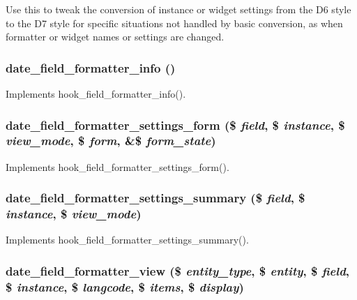 Use this to tweak the conversion of instance or widget settings from the D6 style to the D7 style for specific situations not handled by basic conversion, as when formatter or widget names or settings are changed. \hypertarget{date_8field_8inc_a41de0b573e603d7d442c261660b76855}{
\subsubsection[{date\_\-field\_\-formatter\_\-info}]{\setlength{\rightskip}{0pt plus 5cm}date\_\-field\_\-formatter\_\-info ()}}
\label{date_8field_8inc_a41de0b573e603d7d442c261660b76855}
Implements hook\_\-field\_\-formatter\_\-info(). \hypertarget{date_8field_8inc_a224654ed8b7e1a260375ed74e5fc0d74}{
\subsubsection[{date\_\-field\_\-formatter\_\-settings\_\-form}]{\setlength{\rightskip}{0pt plus 5cm}date\_\-field\_\-formatter\_\-settings\_\-form (\$ {\em field}, \/  \$ {\em instance}, \/  \$ {\em view\_\-mode}, \/  \$ {\em form}, \/  \&\$ {\em form\_\-state})}}
\label{date_8field_8inc_a224654ed8b7e1a260375ed74e5fc0d74}
Implements hook\_\-field\_\-formatter\_\-settings\_\-form(). \hypertarget{date_8field_8inc_a10367ff3000283b8d15281b0340a318a}{
\subsubsection[{date\_\-field\_\-formatter\_\-settings\_\-summary}]{\setlength{\rightskip}{0pt plus 5cm}date\_\-field\_\-formatter\_\-settings\_\-summary (\$ {\em field}, \/  \$ {\em instance}, \/  \$ {\em view\_\-mode})}}
\label{date_8field_8inc_a10367ff3000283b8d15281b0340a318a}
Implements hook\_\-field\_\-formatter\_\-settings\_\-summary(). \hypertarget{date_8field_8inc_a054ff404fcc81a7bd9937070266c87a6}{
\subsubsection[{date\_\-field\_\-formatter\_\-view}]{\setlength{\rightskip}{0pt plus 5cm}date\_\-field\_\-formatter\_\-view (\$ {\em entity\_\-type}, \/  \$ {\em entity}, \/  \$ {\em field}, \/  \$ {\em instance}, \/  \$ {\em langcode}, \/  \$ {\em items}, \/  \$ {\em display})}}
